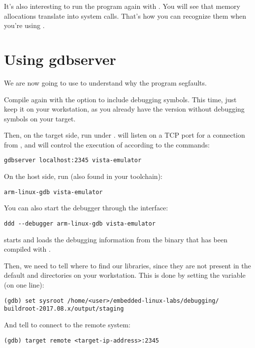 It's also interesting to run the program again with . You
will see that memory allocations translate into  system 
calls. That's how you can recognize them when you're using
.

\section{Using gdbserver}

We are now going to use  to understand why the program
segfaults.

Compile  again with the  option to
include debugging symbols. This time, just keep it on your workstation,
as you already have the version without debugging symbols on your target.

Then, on the target side, run  under
.  will listen on a TCP port for a
connection from , and will control the execution of
 according to the  commands:

\begin{verbatim}
gdbserver localhost:2345 vista-emulator
\end{verbatim}

On the host side, run  (also found in your toolchain):
\begin{verbatim}
arm-linux-gdb vista-emulator
\end{verbatim}

You can also start the debugger through the  interface:
\begin{verbatim}
ddd --debugger arm-linux-gdb vista-emulator
\end{verbatim}

 starts and loads the debugging information from the
 binary that has been compiled with .

Then, we need to tell where to find our libraries, since they are not
present in the default  and  directories on
your workstation. This is done by setting the  
variable (on one line):

\begin{verbatim}
(gdb) set sysroot /home/<user>/embedded-linux-labs/debugging/
buildroot-2017.08.x/output/staging
\end{verbatim}

And tell  to connect to the remote system:
\begin{verbatim}
(gdb) target remote <target-ip-address>:2345
\end{verbatim}

